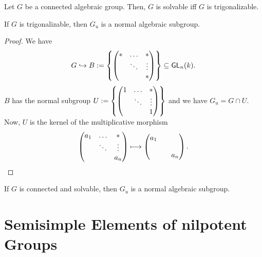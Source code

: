 \begin{corollary}
	Let $G$ be a connected algebraic group. Then, $G$ is solvable iff $G$ is trigonalizable.
\end{corollary}

\begin{proposition}
	If $G$ is trigonalizable, then $G_u$ is a normal algebraic subgroup.
\end{proposition}
\begin{proof}
	We have
	\[ G \overset{}{\hookrightarrow} B:= \left\lbrace
\left(\begin{matrix} * & \ldots & *\\  & \ddots & \vdots \\ & & * \end{matrix}\right)	
\right\rbrace  \subseteq \textsf{GL}_n(k). \]
$B$ has the normal subgroup $U := \left\lbrace
	\left(\begin{matrix} 1 & \ldots & *\\  & \ddots & \vdots \\ & & 1 \end{matrix}\right)	
\right\rbrace$ and we have $G_u = G \cap U$. Now, $U$ is the kernel of the multiplicative morphism
\[ 
\left(\begin{matrix} a_1 & \ldots & * \\ & \ddots & \vdots \\ & & a_n \end{matrix}\right) \longmapsto \left(\begin{matrix} a_1 &  &  \\ &  &  \\ & & a_n \end{matrix}\right).
\]
\end{proof}
\begin{corollary}
	If $G$ is connected and solvable, then $G_u$ is a normal algebraic subgroup.
\end{corollary}

\section{Semisimple Elements of nilpotent Groups}

